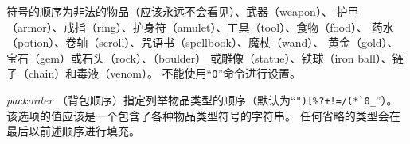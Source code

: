 \documentclass[a4paper, 10pt]{article}
\newcommand{\ib}[1]{\it #1 \hfill}
\begin{document}
符号的顺序为非法的物品（应该永远不会看见）、武器（weapon）、
护甲（armor）、戒指（ring）、护身符（amulet）、工具（tool）、食物（food）、
药水（potion）、卷轴（scroll）、咒语书（spellbook）、魔杖（wand）、
黄金（gold）、宝石（gem）或石头（rock）、\zhTransBoulders（boulder）
或雕像（statue）、铁球（iron ball）、链子（chain）和毒液（venom）。
不能使用“{\tt O}”命令进行设置。
\item[\ib{packorder}]
（背包顺序）指定列举物品类型的顺序（默认为“\verb&")[%?+!=/(*`0_&”）。
该选项的值应该是一个包含了各种物品类型符号的字符串。
任何省略的类型会在最后以前述顺序进行填充。
\end{document}

